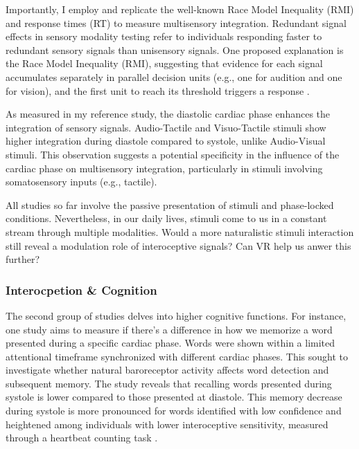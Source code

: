 \documentclass[12pt,oneside,openright]{report}
\begin{document}
Importantly, I employ and replicate the well-known Race Model Inequality (RMI) and response times (RT) to measure multisensory integration. Redundant signal effects in sensory modality testing refer to individuals responding faster to redundant sensory signals than unisensory signals. One proposed explanation is the Race Model Inequality (RMI), suggesting that evidence for each signal accumulates separately in parallel decision units (e.g., one for audition and one for vision), and the first unit to reach its threshold triggers a response \parencite{Innes2019ACA, MILLER1982247}.

As measured in my reference study, the diastolic cardiac phase enhances the integration of sensory signals. Audio-Tactile and Visuo-Tactile stimuli show higher integration during diastole compared to systole, unlike Audio-Visual stimuli. This observation suggests a potential specificity in the influence of the cardiac phase on multisensory integration, particularly in stimuli involving somatosensory inputs (e.g., tactile).

All studies so far involve the passive presentation of stimuli and phase-locked conditions. Nevertheless, in our daily lives, stimuli come to us in a constant stream through multiple modalities. Would a more naturalistic stimuli interaction still reveal a modulation role of interoceptive signals? Can VR help us anwer this further?


\subsubsection*{Interocpetion \& Cognition}

The second group of studies delves into higher cognitive functions. For instance, one study aims to measure if there's a difference in how we memorize a word presented during a specific cardiac phase. Words were shown within a limited attentional timeframe synchronized with different cardiac phases. This sought to investigate whether natural baroreceptor activity affects word detection and subsequent memory. The study reveals that recalling words presented during systole is lower compared to those presented at diastole. This memory decrease during systole is more pronounced for words identified with low confidence and heightened among individuals with lower interoceptive sensitivity, measured through a heartbeat counting task \parencite{Garfinkel2013-cy}.
\end{document}
